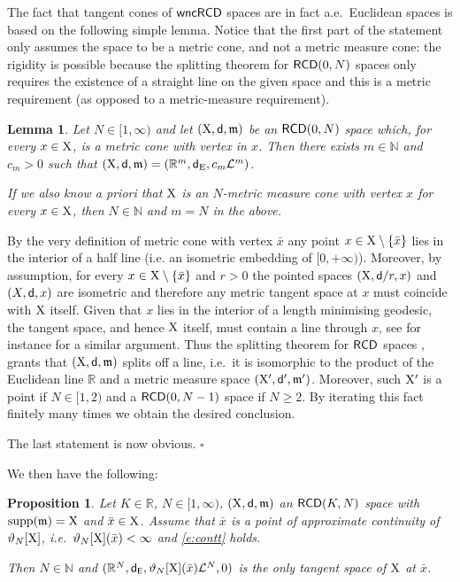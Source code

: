 \documentclass[reqno,11pt]{article}
\numberwithin{equation}{section}
\newcommand{\N}{\mathbb{N}}
\newcommand{\R}{\mathbb{R}}
\newcommand{\mm}{{\mbox{\boldmath$m$}}}
\newcommand{\sfd}{{\sf d}}
\newcommand{\supp}{\mathop{\rm supp}\nolimits}   %
\renewcommand{\mm}{\mathfrak m}                                %
\renewenvironment{proof}{\removelastskip\par\medskip   %
\noindent{\em Proof} \rm}{\penalty-20\null\hfill$\square$\par\medbreak}
\newtheorem{lemma}[theorem]{Lemma}
\newtheorem{proposition}[theorem]{Proposition}
\newcommand{\X}{{\rm X}}
\newcommand{\RCD}{{\sf RCD}}
\newcommand{\wncRCD}{{\sf wncRCD}}
\newcommand{\Eu}{{\sf E}}
\newcommand{\LL}{{\mathcal L}}
\begin{document}
The fact that tangent cones of $\wncRCD$ spaces are in fact a.e.\ Euclidean spaces is based on the following simple lemma. Notice that the first part of the statement only assumes the space to be a metric cone, and not a metric measure cone: the rigidity is possible because the splitting theorem for $\RCD(0,N)$ spaces only requires the existence of a straight line on the given space and this is a metric requirement (as opposed to a metric-measure requirement). 
\begin{lemma}\label{lm:favaa}
 Let  {$N\in [1,\infty)$} and let $(\X,\sfd,\mm)$ be an  $\RCD(0,N)$ space which, for every $x\in\X$,  is a metric  cone with vertex in \(x\). Then there exists \(m\in \N\) and \(c_m>0\)  such that \((\X,\sfd,\mm)=(\R^m,\sfd_{\rm  E}, c_m \LL^m)\). 
 
 If we also know a priori that $\X$ is an $N$-metric measure cone with vertex $x$ for every $x\in\X$, then $N\in\N$ and $m=N$ in the above.
\end{lemma}
\begin{proof}
By the very definition of metric cone with vertex \(\bar x\) any point \(x\in \X\setminus\{\bar x\}\) lies in the interior of a half line (i.e. an isometric embedding of \([0,+\infty)\)). Moreover, by assumption, for every \(x\in \X\setminus\{\bar x\}\) and \(r>0\)  the pointed  spaces  \((\X,\sfd/r,x)\) and \((X,\sfd,x)\) are isometric and therefore any metric tangent space at $x$ must coincide with $\X$ itself. Given that $x$ lies in the interior of a length minimising geodesic, the tangent space, and hence $\X$ itself, must contain a line through $x$, see for instance \cite[Proof of Theorem 1.1]{GigliMondinoRajala15} for a similar argument. Thus the splitting theorem for $\RCD$ spaces \cite{Gigli13}, \cite{Gigli13over} grants that  \((\X,\sfd,\mm)\) splits off a line{, i.e.\ it is isomorphic to the product of the Euclidean line $\R$ and a metric measure space \((\X',\sfd',\mm')\). Moreover, such $\X'$ is a point if $N\in[1,2)$ and a $\RCD(0,N-1)$ space if $N\geq 2$}. By iterating this fact finitely many times we obtain the desired conclusion.

The last statement is now obvious.
\end{proof}
We then have the following:
\begin{proposition}\label{prop:tang}
Let $K\in\R$, $N\in[1,\infty)$, $(\X,\sfd,\mm)$ an $\RCD(K,N)$ space with $\supp(\mm)=\X$ and $\bar x\in\X$. Assume that $\bar x$ is a point of approximate continuity of $\vartheta_N[\X]$, i.e.\ $\vartheta_N[\X](\bar x)<\infty$ and \eqref{e:contt}  holds.

Then $N\in\N$ and $(\R^N,\sfd_\Eu,\vartheta_N[\X](\bar x)\mathcal L^N,0)$ is the only tangent space of $\X$ at $\bar x$.
\end{proposition}
\end{document}
